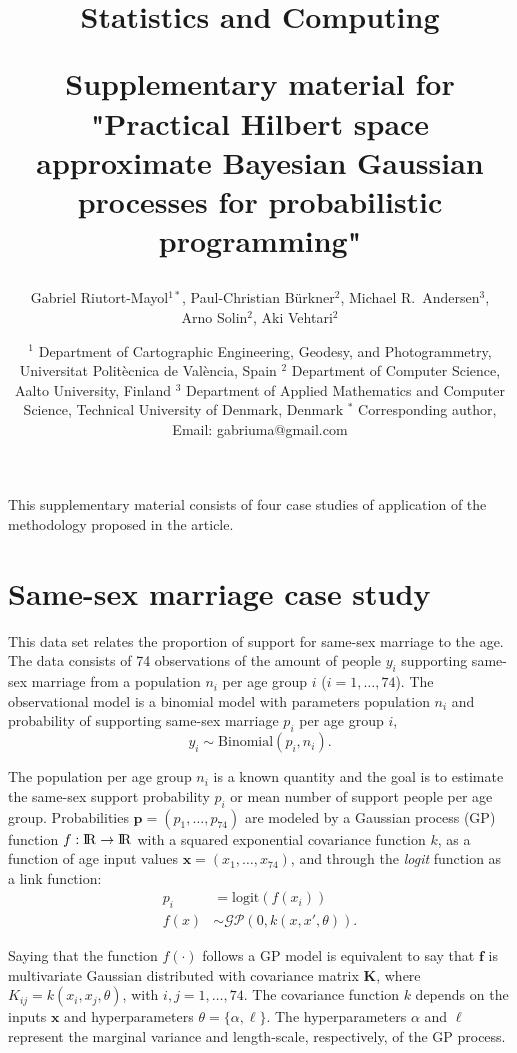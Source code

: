 \documentclass[onecolumn,a4paper,11pt]{article}
\title{\begin{flushleft}
\textsf{\small Statistics and Computing}
\end{flushleft}  \vspace{0.5cm}  Supplementary material for "Practical Hilbert space approximate Bayesian Gaussian processes for probabilistic programming"}
\author{Gabriel Riutort-Mayol$^{1*}$, Paul-Christian Bürkner$^2$, Michael R.\ Andersen$^{3}$,\\
  Arno Solin$^{2}$, Aki Vehtari$^{2}$}
\date{ \small
$^1$ Department of Cartographic Engineering, Geodesy, and Photogrammetry, Universitat Polit\`ecnica de Val\`encia, Spain 
\break
$^2$ Department of Computer Science, Aalto University, Finland
\break
$^3$ Department of Applied Mathematics and Computer Science, Technical University of Denmark, Denmark
\break
$^*$ Corresponding author, Email: gabriuma@gmail.com
}
\begin{document}
\maketitle

This supplementary material consists of four case studies of application of the methodology proposed in the article.

\tableofcontents

\appendix


\section{Same-sex marriage case study}\label{ch5_sec_studycaseII}
This data set relates the proportion of support for same-sex marriage to the age. The data consists of 74 observations of the amount of people $y_i$ supporting same-sex marriage from a population $n_i$ per age group $i$ ($i=1,\dots,74$). The observational model is a binomial model with parameters population $n_i$ and probability of supporting same-sex marriage $p_i$ per age group $i$,
%
\begin{equation*}
y_i \sim \mathrm{Binomial}(p_i, n_i).
\end{equation*}

\noindent The population per age group $n_i$ is a known quantity and the goal is to estimate the same-sex support probability $p_i$ or mean number of support people per age group. Probabilities $\bm{p}=(p_1,\dots,p_{74})$ are modeled by a Gaussian process (GP) function $f:{\rm I\!R} \to {\rm I\!R}$ with a squared exponential covariance function $k$, as a function of age input values $\bm{x}=(x_1,\dots,x_{74})$, and through the {\it logit} function as a link function:
%
\begin{align*} \label{ch5_eq_gpprior_gay}
p_i &= \mathrm{logit}(f(x_i)) \nonumber \\
f(x) &\sim \mathcal{GP}(0, k(x,x', \theta)).
\end{align*}

\noindent Saying that the function $f(\cdot)$ follows a GP model is equivalent to say that $\bm{f}$ is multivariate Gaussian distributed with covariance matrix $\bm{K}$, where $K_{ij}=k(x_i,x_j,\theta)$, with $i,j=1,\dots,74$. The covariance function $k$ depends on the inputs $\bm{x}$ and hyperparameters $\theta=\{\alpha,\ell\}$. The hyperparameters $\alpha$ and $\ell$ represent the marginal variance and length-scale, respectively, of the GP process.
\end{document}
